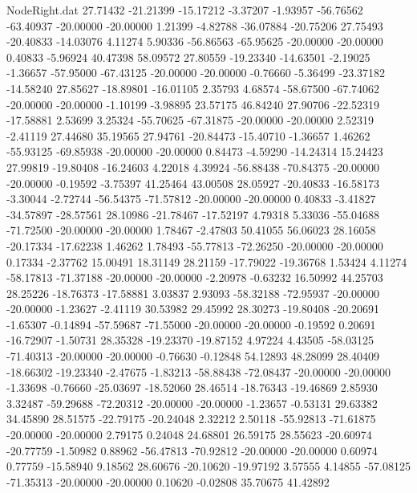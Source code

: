 \begin{filecontents}{NodeRight.dat}
  27.71432  -21.21399  -15.17212    -3.37207   -1.93957  -56.76562  -63.40937  -20.00000  -20.00000    1.21399   -4.82788  -36.07884  -20.75206
  27.75493  -20.40833  -14.03076     4.11274    5.90336  -56.86563  -65.95625  -20.00000  -20.00000    0.40833   -5.96924   40.47398   58.09572
  27.80559  -19.23340  -14.63501    -2.19025   -1.36657  -57.95000  -67.43125  -20.00000  -20.00000   -0.76660   -5.36499  -23.37182  -14.58240
  27.85627  -18.89801  -16.01105     2.35793    4.68574  -58.67500  -67.74062  -20.00000  -20.00000   -1.10199   -3.98895   23.57175   46.84240
  27.90706  -22.52319  -17.58881     2.53699    3.25324  -55.70625  -67.31875  -20.00000  -20.00000    2.52319   -2.41119   27.44680   35.19565
  27.94761  -20.84473  -15.40710    -1.36657    1.46262  -55.93125  -69.85938  -20.00000  -20.00000    0.84473   -4.59290  -14.24314   15.24423
  27.99819  -19.80408  -16.24603     4.22018    4.39924  -56.88438  -70.84375  -20.00000  -20.00000   -0.19592   -3.75397   41.25464   43.00508
  28.05927  -20.40833  -16.58173    -3.30044   -2.72744  -56.54375  -71.57812  -20.00000  -20.00000    0.40833   -3.41827  -34.57897  -28.57561
  28.10986  -21.78467  -17.52197     4.79318    5.33036  -55.04688  -71.72500  -20.00000  -20.00000    1.78467   -2.47803   50.41055   56.06023
  28.16058  -20.17334  -17.62238     1.46262    1.78493  -55.77813  -72.26250  -20.00000  -20.00000    0.17334   -2.37762   15.00491   18.31149
  28.21159  -17.79022  -19.36768     1.53424    4.11274  -58.17813  -71.37188  -20.00000  -20.00000   -2.20978   -0.63232   16.50992   44.25703
  28.25226  -18.76373  -17.58881     3.03837    2.93093  -58.32188  -72.95937  -20.00000  -20.00000   -1.23627   -2.41119   30.53982   29.45992
  28.30273  -19.80408  -20.20691    -1.65307   -0.14894  -57.59687  -71.55000  -20.00000  -20.00000   -0.19592    0.20691  -16.72907   -1.50731
  28.35328  -19.23370  -19.87152     4.97224    4.43505  -58.03125  -71.40313  -20.00000  -20.00000   -0.76630   -0.12848   54.12893   48.28099
  28.40409  -18.66302  -19.23340    -2.47675   -1.83213  -58.88438  -72.08437  -20.00000  -20.00000   -1.33698   -0.76660  -25.03697  -18.52060
  28.46514  -18.76343  -19.46869     2.85930    3.32487  -59.29688  -72.20312  -20.00000  -20.00000   -1.23657   -0.53131   29.63382   34.45890
  28.51575  -22.79175  -20.24048     2.32212    2.50118  -55.92813  -71.61875  -20.00000  -20.00000    2.79175    0.24048   24.68801   26.59175
  28.55623  -20.60974  -20.77759    -1.50982    0.88962  -56.47813  -70.92812  -20.00000  -20.00000    0.60974    0.77759  -15.58940    9.18562
  28.60676  -20.10620  -19.97192     3.57555    4.14855  -57.08125  -71.35313  -20.00000  -20.00000    0.10620   -0.02808   35.70675   41.42892

\end{filecontents}
